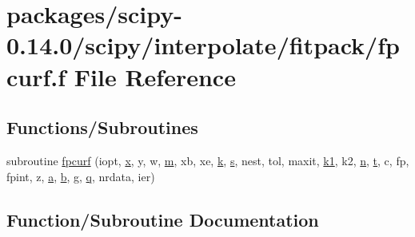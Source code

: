 \hypertarget{fpcurf_8f}{}\section{packages/scipy-\/0.14.0/scipy/interpolate/fitpack/fpcurf.f File Reference}
\label{fpcurf_8f}
\subsection*{Functions/\+Subroutines}
\begin{DoxyCompactItemize}
\item 
subroutine \hyperlink{fpcurf_8f_a25fb935e3a0807aa074baa9c415395f0}{fpcurf} (iopt, \hyperlink{vecnorm1_8cc_ac73eed9e41ec09d58f112f06c2d6cb63}{x}, y, w, \hyperlink{indexexpr_8h_ab72fdb4031d47b75ab26dd18a437bcdc}{m}, xb, xe, \hyperlink{indexexpr_8h_abb72938a198351550846b37a84588b63}{k}, \hyperlink{indexexpr_8h_ae024b0db549122b44c349ae28ec990dc}{s}, nest, tol, maxit, \hyperlink{cephes_8h_aea4a28d7f448efcb4713416bd1f3cf49}{k1}, k2, \hyperlink{indexexpr_8h_ab427e2e2b4d6cec55fa088ea2a692ace}{n}, \hyperlink{indexexpr_8h_a01709998b82be3f34e0412206618d09d}{t}, c, fp, fpint, z, \hyperlink{gen__mat5files_8m_aae328bf20413f220e38aec4d95bfd6da}{a}, \hyperlink{gen__mat5files_8m_a7b38767b3b6a8dae167e5afa4fc340b0}{b}, g, \hyperlink{indexexpr_8h_ac886c3584e464b5533390d7440c9dd98}{q}, nrdata, ier)
\end{DoxyCompactItemize}


\subsection{Function/\+Subroutine Documentation}
\hypertarget{fpcurf_8f_a25fb935e3a0807aa074baa9c415395f0}{}
